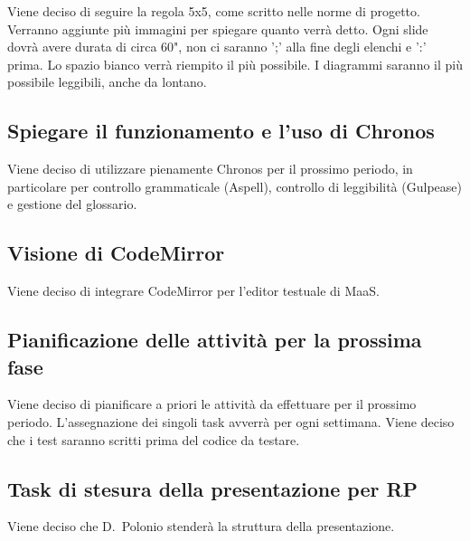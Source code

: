 \documentclass[11pt]{meetingmins}
\begin{document}
Viene deciso di seguire la regola 5x5, come scritto nelle norme di progetto. Verranno aggiunte più immagini per spiegare quanto verrà detto. Ogni slide dovrà avere durata di circa 60", non ci saranno ';' alla fine degli elenchi e ':' prima. Lo spazio bianco verrà riempito il più possibile. I diagrammi saranno il più possibile leggibili, anche da lontano.

\subsection{Spiegare il funzionamento e l'uso di Chronos}

Viene deciso di utilizzare pienamente Chronos per il prossimo periodo, in particolare per controllo grammaticale (Aspell), controllo di leggibilità (Gulpease) e gestione del glossario. 

\subsection{Visione di CodeMirror}

Viene deciso di integrare CodeMirror per l'editor testuale di MaaS.

\subsection{Pianificazione delle attività per la prossima fase}

Viene deciso di pianificare a priori le attività da effettuare per il prossimo periodo. L'assegnazione dei singoli task avverrà per ogni settimana. Viene deciso che i test saranno scritti prima del codice da testare. 

\subsection{Task di stesura della presentazione per RP}

Viene deciso che D.~Polonio stenderà la struttura della presentazione.

\end{document}

